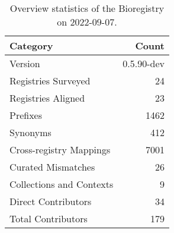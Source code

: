 \begin{table}
\centering
\caption{Overview statistics of the Bioregistry on 2022-09-07.}
\label{tab:bioregistry-summary}
\begin{tabular}{lr}
\toprule
                Category &      Count \\
\midrule
                 Version & 0.5.90-dev \\
     Registries Surveyed &         24 \\
      Registries Aligned &         23 \\
                Prefixes &       1462 \\
                Synonyms &        412 \\
 Cross-registry Mappings &       7001 \\
      Curated Mismatches &         26 \\
Collections and Contexts &          9 \\
     Direct Contributors &         34 \\
      Total Contributors &        179 \\
\bottomrule
\end{tabular}
\end{table}
